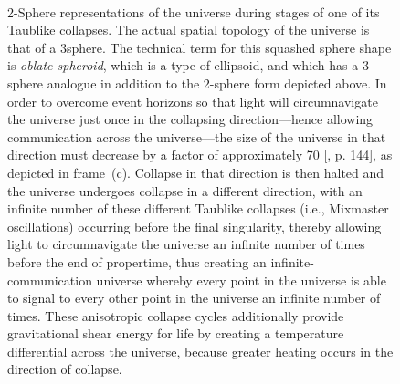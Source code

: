 \documentclass[letterpaper,12pt]{article}
\begin{document}
\begin{figure}[htbp]
  \centering
  ~
  ~
  \caption[The Universe's Taublike Collapse Cycles]{2-Sphere representations of the universe during stages of one of its Taublike collapses. The actual spatial topology of the universe is that of a \protect\gls{3sphere}. The technical term for this squashed sphere shape is \emph{oblate spheroid}, which is a type of ellipsoid, and which has a 3-sphere analogue in addition to the 2-sphere form depicted above. In order to overcome event horizons so that light will circumnavigate the universe just once in the collapsing direction---hence allowing communication across the universe---the size of the universe in that direction must decrease by a factor of approximately 70 [, p. 144], as depicted in frame~(c). Collapse in that direction is then halted and the universe undergoes collapse in a different direction, with an infinite number of these different Taublike collapses (i.e., Mixmaster oscillations) occurring before the final singularity, thereby allowing light to circumnavigate the universe an infinite number of times before the end of \protect\gls{propertime}, thus creating an infinite-communication universe whereby every point in the universe is able to signal to every other point in the universe an infinite number of times. These anisotropic collapse cycles additionally provide gravitational shear energy for life by creating a temperature differential across the universe, because greater heating occurs in the direction of collapse.}
  \label{fig:oblate-spheroid}
\end{figure}
\end{document}
